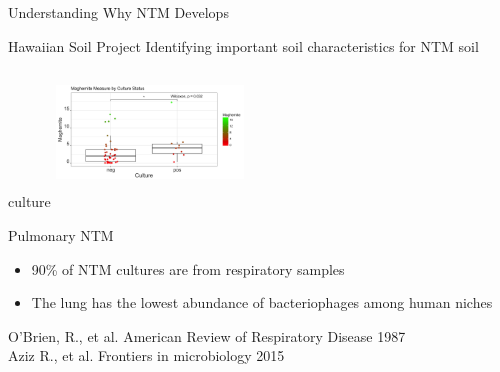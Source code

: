 \documentclass[11pt]{beamer}
\begin{document}
	\begin{frame}{Understanding Why NTM Develops}
	\begin{block}{Hawaiian Soil Project}
	Identifying important soil characteristics for NTM soil culture 
	\center
	\includegraphics[height=4cm, width=5cm]{soil.jpeg}
	
	\end{block}
	\vspace{-0.5cm}
	\begin{block}{Pulmonary NTM}
	\vspace{-0.3cm}
	\begin{itemize}
	\item 90\% of NTM cultures are from respiratory samples
	\item The lung has the lowest abundance of bacteriophages among human niches
	\end{itemize}
	\end{block}
	
	
	
	\tiny{O'Brien, R., et al. American Review of Respiratory Disease 1987 \\ Aziz R., et al. Frontiers in microbiology 2015}

	
	\end{frame}
	
\end{document}
